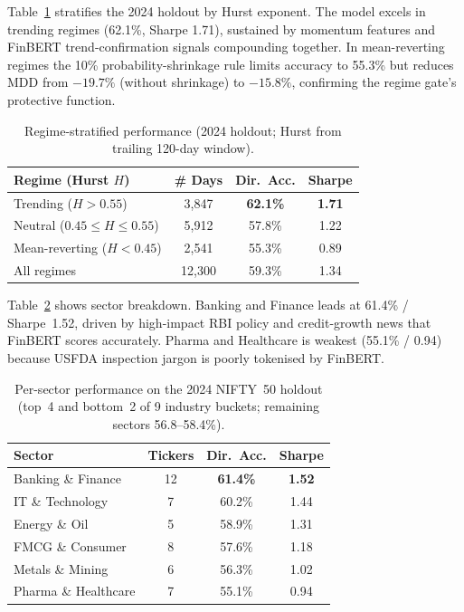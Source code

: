 \documentclass[12pt,a4paper]{article}
\begin{document}
Table~\ref{tab:regime} stratifies the 2024 holdout by Hurst exponent. The model
excels in trending regimes (62.1\%, Sharpe 1.71), sustained by momentum features
and FinBERT trend-confirmation signals compounding together. In mean-reverting
regimes the 10\% probability-shrinkage rule limits accuracy to 55.3\% but reduces
MDD from $-19.7\%$ (without shrinkage) to $-15.8\%$, confirming the regime gate's
protective function.

\begin{table}[h]
\centering
\caption{Regime-stratified performance (2024 holdout; Hurst from trailing 120-day window).}
\label{tab:regime}
\footnotesize
\begin{tabular}{lccc}
\toprule
\textbf{Regime (Hurst $H$)} & \textbf{\# Days} & \textbf{Dir.\ Acc.} & \textbf{Sharpe} \\
\midrule
Trending ($H>0.55$)            & 3{,}847  & \textbf{62.1\%} & \textbf{1.71} \\
Neutral ($0.45\leq H\leq 0.55$) & 5{,}912  & 57.8\% & 1.22 \\
Mean-reverting ($H<0.45$)      & 2{,}541  & 55.3\% & 0.89 \\
All regimes                    & 12{,}300 & 59.3\% & 1.34 \\
\bottomrule
\end{tabular}
\end{table}

Table~\ref{tab:sector} shows sector breakdown. Banking and Finance leads at
61.4\% / Sharpe~1.52, driven by high-impact RBI policy and credit-growth news
that FinBERT scores accurately. Pharma and Healthcare is weakest (55.1\% / 0.94)
because USFDA inspection jargon is poorly tokenised by FinBERT.

\begin{table}[h]
\centering
\caption{Per-sector performance on the 2024 NIFTY~50 holdout (top~4 and
bottom~2 of 9 industry buckets; remaining sectors 56.8--58.4\%).}
\label{tab:sector}
\footnotesize
\begin{tabular}{lccc}
\toprule
\textbf{Sector} & \textbf{Tickers} & \textbf{Dir.\ Acc.} & \textbf{Sharpe} \\
\midrule
Banking \& Finance   & 12 & \textbf{61.4\%} & \textbf{1.52} \\
IT \& Technology     & 7  & 60.2\% & 1.44 \\
Energy \& Oil        & 5  & 58.9\% & 1.31 \\
FMCG \& Consumer     & 8  & 57.6\% & 1.18 \\
\midrule
Metals \& Mining     & 6  & 56.3\% & 1.02 \\
Pharma \& Healthcare & 7  & 55.1\% & 0.94 \\
\bottomrule
\end{tabular}
\end{table}
\end{document}
